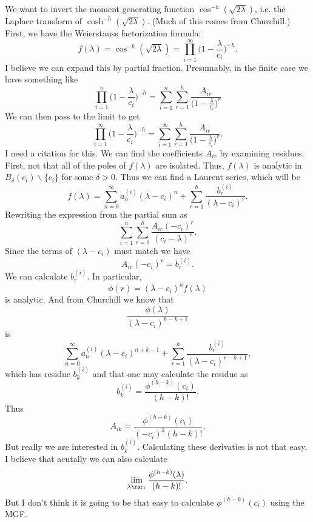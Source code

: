 \documentclass[12pt]{article}
\begin{document}
We want to invert the moment generating function $\cos^{-h}(\sqrt{2\lambda})$,
i.e. the Laplace transform of $\cosh^{-h}(\sqrt{2 \lambda})$.  (Much of this
comes from Churchill.)  First, we have the Weierstauss factorization formula:
\[
f(\lambda) = \cos^{-h}(\sqrt{2 \lambda}) = \prod_{i=1}^\infty \Big(1 -
\frac{\lambda}{c_i}\Big)^{-h}.
\]
I believe we can expand this by partial fraction.  Presumably, in the finite
case we have something like
\[
\prod_{i=1}^n \Big(1 - \frac{\lambda}{c_i}\Big)^{-h} = \sum_{i=1}^n \sum_{r=1}^h
\frac{A_{ir}}{\Big(1 - \frac{\lambda}{c_i}\Big)^{r}}
\]
We can then pass to the limit to get
\[
\prod_{i=1}^\infty \Big(1 - \frac{\lambda}{c_i}\Big)^{-h} = \sum_{i=1}^\infty \sum_{r=1}^h
\frac{A_{ir}}{\Big(1 - \frac{\lambda}{c_i}\Big)^r}.
\]
I need a citation for this.  We can find the coefficients $A_{ir}$ by examining
residues.  First, not that all of the poles of $f(\lambda)$ are isolated.  Thus,
$f(\lambda)$ is analytic in $B_{\delta}(c_i) \backslash \{c_i\}$ for some
$\delta > 0$.  Thus we can find a Laurent series, which will be
\[
f(\lambda) = \sum_{n=0}^\infty a_n^{(i)} (\lambda - c_i)^n + \sum_{r=1}^h
\frac{b_r^{(i)}}{(\lambda - c_i)^{r}}.
\]
Rewriting the expression from the partial sum as
\[
\sum_{i=1}^n \sum_{r=1}^h \frac{A_{ir} (-c_i)^r}{(c_i - \lambda)^r}.
\]
Since the terms of $(\lambda - c_i)$ must match we have
\[
A_{ir} (-c_i)^r = b_r^{(i)}.
\]
We can calculate $b_r^{(i)}$.  In particular,
\[
\phi(r) = (\lambda - c_i)^h f(\lambda)
\]
is analytic.  And from Churchill we know that
\[
\frac{\phi(\lambda)}{(\lambda-c_i)^{h-k+1}}
\]
is
\[
\sum_{n=0}^\infty a_n^{(i)} (\lambda - c_i)^{n+k-1} + \sum_{r=1}^h
\frac{b_r^{(i)}}{(\lambda - c_i)^{r-k+1}},
\]
which has residue $b_k^{(i)}$ and that one may calculate the residue as
\[
b_k^{(i)} = \frac{\phi^{(h-k)}(c_i)}{(h-k)!}.
\]
Thus
\[
A_{ik} = \frac{\phi^{(h-k)}(c_i)}{(-c_i)^k (h-k)!}.
\]
But really we are interested in $b_k^{(i)}$.  Calculating these derivaties is
not that easy.  I believe that acutally we can also calculate
\[
\lim_{\lambda \ra c_i} \frac{\phi^{(h-k)}(\lambda)}{(h-k)!}.
\]
But I don't think it is going to be that easy to calculate $\phi^{(h-k)}(c_i)$
using the MGF.  
\end{document}
